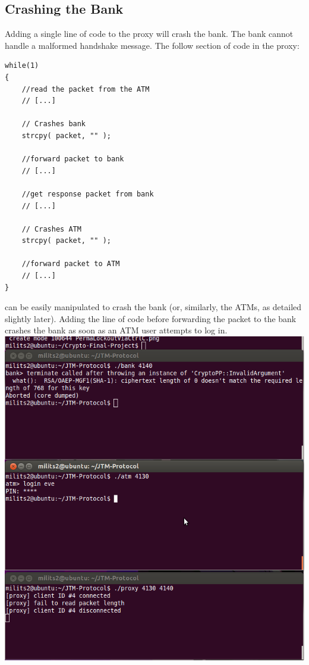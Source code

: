 \documentclass{article}
\begin{document}
\subsection{Crashing the Bank}
Adding a single line of code to the proxy will crash the bank. The bank cannot handle a malformed handshake message. The follow section of code in the proxy:
\begin{lstlisting}
while(1)
{
	//read the packet from the ATM
    // [...]
	
	// Crashes bank
    strcpy( packet, "" );
    
	//forward packet to bank
    // [...]
	
	//get response packet from bank
    // [...]
	
	// Crashes ATM
	strcpy( packet, "" );
	
	//forward packet to ATM
    // [...]
}
\end{lstlisting}
can be easily manipulated to crash the bank (or, similarly, the ATMs, as detailed slightly later). Adding the line of code before forwarding the packet to the bank crashes the bank as soon as an ATM user attempts to log in. 
\\
\includegraphics[scale=0.85]{crashBank.png}
\\
\end{document}
